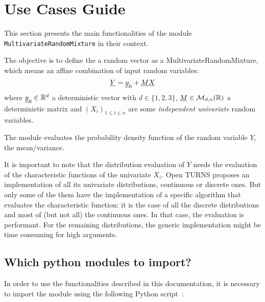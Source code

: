 



\section{Use Cases Guide}

This section presents the main functionalities of the module \texttt{MultivariateRandomMixture} in their context.


The objective is to define the a random vector as a MultivariateRandomMixture, which means an affine combination of input random variables:
$$
\displaystyle   {\underline{Y}}={\underline{y}}_0+{\underline{M}}{\underline{X}}
$$
where ${\underline{y}}_0\in\mathbb{R}^d$ a deterministic vector with  $d\in\{1,2,3\}$, ${\underline{M}}\in\mathcal{M}_{d,n}(\mathbb{R})$ a deterministic matrix
and $(X_i)_{ 1 \leq i \leq n}$ are some  \emph{independent univariate} random variables.

The module evaluates the probability density function of the random variable $Y$, the mean\slash variance.

It is important to note that the distribution evaluation of $Y$ needs the evaluation of the characteristic functions of the univariate $X_i$. 
Open TURNS proposes an implementation of all its univariate distributions, continuous or discrete ones. 
But only some of the them have the implementation of a specific algorithm that evaluates the characteristic function: 
it is the case of all the discrete distributions and most of (but not all) the continuous ones. 
In that case, the evaluation is performant. 
For the remaining distributions, the generic implementation might be time consuming for high arguments.


\subsection{Which python modules to import?}

In order to use the functionalities described in this documentation, it is necessary to import the module 
using the following Python script~:

